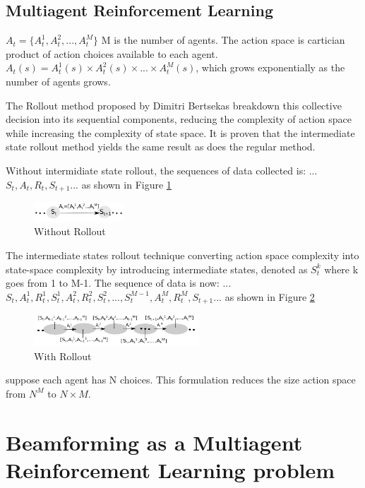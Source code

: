 \documentclass[journal]{IEEEtran}
\begin{document}
\subsection{Multiagent Reinforcement Learning}
$A_t=\{A_t^1,A_t^2,...,A_t^M\}$ M is the number of agents. The action space is cartician product of action choices available to each agent. $A_t(s)=A_t^1(s) \times A_t^2(s) \times ... \times A_t^M(s)$, which grows exponentially as the number of agents grows.

The Rollout method proposed by Dimitri Bertsekas breakdown this collective decision into its sequential components, reducing the complexity of action space while increasing the complexity of state space. It is proven that the intermediate state rollout method yields the same result as does the regular method. \cite{Bertsekas2019MultiagentRA}

Without intermidiate state rollout, the sequences of data collected is:
...$S_t, A_t, R_t, S_{t+1}$... as shown in Figure \ref{fig:without}

\begin{figure}[H]
\centering
\includegraphics[width=0.3\textwidth]{without.png}
\caption{Without Rollout}
\label{fig:without}
\end{figure}

The intermediate states rollout technique converting action space complexity into state-space complexity by introducing intermediate states, denoted as $S_t^k$ where k goes from 1 to M-1. The sequence of data is now: ...$S_t,A_t^1,R_t^1,S_t^1,A_t^2,R_t^2, S_t^2, ... , S_t^{M-1},A_t^M,R_t^M,S_{t+1}$... as shown in Figure \ref{fig:with}

\begin{figure}[H]
\centering
\includegraphics[width=0.55\textwidth]{with.png}
\caption{With Rollout}
\label{fig:with}
\end{figure}
suppose each agent has N choices. This formulation reduces the size action space from $N^M$ to $N \times M$.


\section{Beamforming as a Multiagent Reinforcement Learning problem}
\end{document}
